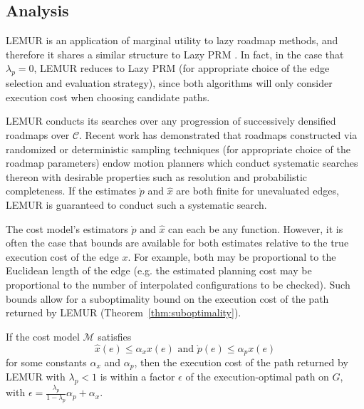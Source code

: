\subsection{Analysis}

LEMUR is an application of marginal utility to lazy roadmap methods,
and therefore it shares a similar structure
to Lazy PRM \citep{bohlin2000lazyprm}.
In fact, in the case that $\lambda_p=0$,
LEMUR reduces to Lazy PRM
(for appropriate choice of the edge selection and evaluation strategy),
since both algorithms will only consider execution cost when choosing
candidate paths.

LEMUR conducts its searches over any progression of
successively densified roadmaps over $\mathcal{C}$.
Recent work has demonstrated that roadmaps constructed via
randomized \citep{karaman2011samplingoptimal}
or deterministic \citep{janson2015deterministicsampling} sampling
techniques
(for appropriate choice of the roadmap parameters)
endow motion planners which conduct systematic searches thereon
with desirable properties such as resolution
and probabilistic completeness.
If the estimates $\grave{p}$ and $\hat{x}$
are both finite for unevaluated edges,
LEMUR is guaranteed to conduct such a systematic search.

The cost model's estimators $\grave{p}$ and $\hat{x}$ can each be any
function.
However,
it is often the case that bounds are available for both estimates
relative to the true execution cost of the edge $x$.
For example,
both may be proportional to the Euclidean length of the edge
(e.g. the estimated planning cost may be proportional to the number
of interpolated configurations to be checked).
Such bounds allow for a suboptimality bound on the execution cost
of the path returned by LEMUR
(Theorem~\ref{thm:suboptimality}).

\begin{theorem}
   \label{thm:suboptimality}
   If the cost model $\mathcal{M}$
   satisfies
   \begin{equation}
      \hat{x}(e) \leq \alpha_x x(e)
      \mbox{ and }
      \grave{p}(e) \leq \alpha_p x(e)
      \label{eqn:suboptimality-conditions}
   \end{equation}
   for some constants $\alpha_x$ and $\alpha_p$,
   then the execution cost of the path returned by LEMUR
   with $\lambda_p < 1$
   is within a factor $\epsilon$ of the
   execution-optimal path on $G$,
   with $\epsilon = \frac{\lambda_p}{1 - \lambda_p}\alpha_p + \alpha_x$.
\end{theorem}

